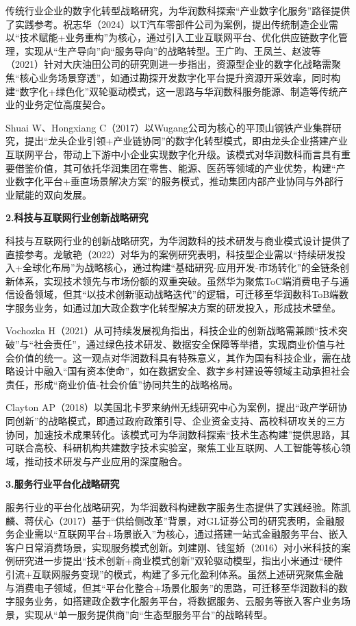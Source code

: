 \documentclass[UTF8, a4paper, 11pt]{ctexart}
\begin{document}
\begin{UnifiedBox}
传统行业企业的数字化转型战略研究，为华润数科探索``产业数字化服务''路径提供了实践参考。祝志华（2024）以T汽车零部件公司为案例，提出传统制造企业需以``技术赋能+业务重构''为核心，通过引入工业互联网平台、优化供应链数字化管理，实现从``生产导向''向``服务导向''的战略转型。王广昀、王凤兰、赵波等（2021）针对大庆油田公司的研究则进一步指出，资源型企业的数字化战略需聚焦``核心业务场景穿透''，如通过勘探开发数字化平台提升资源开采效率，同时构建``数字化+绿色化''双轮驱动模式，这一思路与华润数科服务能源、制造等传统产业的业务定位高度契合。

Shuai W、Hongxiang C（2017）以Wugang公司为核心的平顶山钢铁产业集群研究，提出``龙头企业引领+产业链协同''的数字化转型模式，即由龙头企业搭建产业互联网平台，带动上下游中小企业实现数字化升级。该模式对华润数科而言具有重要借鉴价值，其可依托华润集团在零售、能源、医药等领域的产业优势，构建``产业数字化平台+垂直场景解决方案''的服务模式，推动集团内部产业协同与外部行业赋能的双向发展。

\vspace{0.2cm}
\noindent \textbf{2.科技与互联网行业创新战略研究}

科技与互联网行业的创新战略研究，为华润数科的技术研发与商业模式设计提供了直接参考。龙敏艳（2022）对华为的案例研究表明，科技型企业需以``持续研发投入+全球化布局''为战略核心，通过构建``基础研究-应用开发-市场转化''的全链条创新体系，实现技术领先与市场份额的双重突破。虽然华为聚焦ToC端消费电子与通信设备领域，但其``以技术创新驱动战略迭代''的逻辑，可迁移至华润数科ToB端数字服务业务，如通过加大政企数字化转型解决方案的研发投入，形成技术壁垒。

Vochozka H（2021）从可持续发展视角指出，科技企业的创新战略需兼顾``技术突破''与``社会责任''，通过绿色技术研发、数据安全保障等举措，实现商业价值与社会价值的统一。这一观点对华润数科具有特殊意义，其作为国有科技企业，需在战略设计中融入``国有资本使命''，如在数据安全、数字乡村建设等领域主动承担社会责任，形成``商业价值-社会价值''协同共生的战略格局。

Clayton AP（2018）以美国北卡罗来纳州无线研究中心为案例，提出``政产学研协同创新''的战略模式，即通过政府政策引导、企业资金支持、高校科研攻关的三方协同，加速技术成果转化。该模式可为华润数科探索``技术生态构建''提供思路，其可联合高校、科研机构共建数字技术实验室，聚焦工业互联网、人工智能等核心领域，推动技术研发与产业应用的深度融合。

\vspace{0.2cm}
\noindent \textbf{3.服务行业平台化战略研究}

服务行业的平台化战略研究，为华润数科构建数字服务生态提供了实践经验。陈凯麟、蒋伏心（2017）基于``供给侧改革''背景，对GL证券公司的研究表明，金融服务企业需以``互联网平台+场景嵌入''为核心，通过搭建一站式金融服务平台、嵌入客户日常消费场景，实现服务模式创新。刘建刚、钱玺娇（2016）对小米科技的案例研究进一步提出``技术创新+商业模式创新''双轮驱动模型，指出小米通过``硬件引流+互联网服务变现''的模式，构建了多元化盈利体系。虽然上述研究聚焦金融与消费电子领域，但其``平台化整合+场景化服务''的思路，可迁移至华润数科的数字服务业务，如搭建政企数字化服务平台，将数据服务、云服务等嵌入客户业务场景，实现从``单一服务提供商''向``生态型服务平台''的战略转型。


\end{UnifiedBox}
\end{document}
